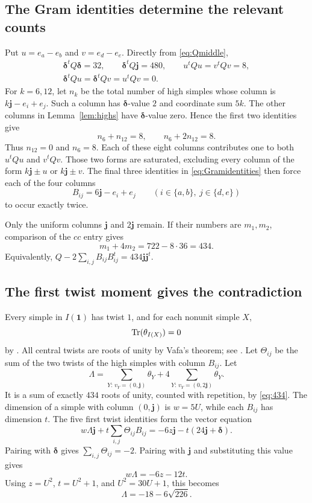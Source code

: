 \documentclass[11pt]{article}
\theoremstyle{remark}\newtheorem{remark}[theorem]{Remark}
\newcommand{\one}{\mathbf1}\newcommand{\jv}{\boldsymbol{j}}\newcommand{\dd}{\boldsymbol{\delta}}
\begin{document}
\subsection{The Gram identities determine the relevant counts}
Put $u=e_a-e_b$ and $v=e_d-e_e$. Directly from \eqref{eq:Qmiddle},
\begin{equation}\label{eq:Gramidentities}
\begin{gathered}
\dd^tQ\dd=32,\qquad\dd^tQ\jv=480,\qquad u^tQu=v^tQv=8,\\
\dd^tQu=\dd^tQv=u^tQv=0.
\end{gathered}
\end{equation}
For $k=6,12$, let $n_k$ be the total number of high simples whose column is $k\jv-e_i+e_j$. Such a column has $\dd$-value $2$ and coordinate sum $5k$. The other columns in Lemma~\ref{lem:highs} have $\dd$-value zero. Hence the first two identities give
\[
n_6+n_{12}=8,\qquad n_6+2n_{12}=8.
\]
Thus $n_{12}=0$ and $n_6=8$. Each of these eight columns contributes one to both $u^tQu$ and $v^tQv$. Those two forms are saturated, excluding every column of the form $k\jv\pm u$ or $k\jv\pm v$. The final three identities in \eqref{eq:Gramidentities} then force each of the four columns
\[
B_{ij}=6\jv-e_i+e_j\qquad(i\in\{a,b\},\ j\in\{d,e\})
\]
to occur exactly twice.

Only the uniform columns $\jv$ and $2\jv$ remain. If their numbers are $m_1,m_2$, comparison of the $cc$ entry gives
\begin{equation}\label{eq:434}
m_1+4m_2=722-8\cdot36=434.
\end{equation}
Equivalently, $Q-2\sum_{i,j}B_{ij}B_{ij}^t=434\jv\jv^t$.

\subsection{The first twist moment gives the contradiction}
Every simple in $I(\one)$ has twist $1$, and for each nonunit simple $X$,
\[
\operatorname{Tr}(\theta_{I(X)})=0
\]
by \cite[Theorem 2.5]{O}. All central twists are roots of unity by Vafa's theorem; see \cite{E}.
Let $\Theta_{ij}$ be the sum of the two twists of the high simples with column $B_{ij}$. Let
\[
\Lambda=\sum_{Y:\,v_Y=(0,\jv)}\theta_Y
+4\sum_{Y:\,v_Y=(0,2\jv)}\theta_Y.
\]
It is a sum of exactly $434$ roots of unity, counted with repetition, by \eqref{eq:434}.
The dimension of a simple with column $(0,\jv)$ is $w=5U$, while each $B_{ij}$ has dimension $t$. The five first twist identities form the vector equation
\begin{equation}\label{eq:firstmoment}
w\Lambda\jv+t\sum_{i,j}\Theta_{ij}B_{ij}
=-6z\jv-t(24\jv+\dd).
\end{equation}
Pairing with $\dd$ gives $\sum_{i,j}\Theta_{ij}=-2$. Pairing with $\jv$ and substituting this value gives
\[
w\Lambda=-6z-12t.
\]
Using $z=U^2$, $t=U^2+1$, and $U^2=30U+1$, this becomes
\begin{equation}\label{eq:rootsum}
\boxed{\Lambda=-18-6\sqrt{226}.}
\end{equation}
\end{document}
